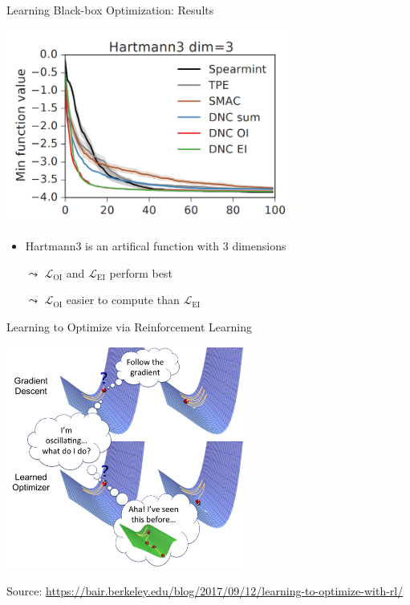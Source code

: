 \begin{frame}[c]{Learning Black-box Optimization: Results\newline {}}

\centering
\includegraphics[width=0.7\textwidth]{images/l2bo_hartmann3}

\begin{itemize}
  \item Hartmann3 is an artifical function with 3 dimensions
  \pause
  \item[$\leadsto$] $\mathcal{L}_{\text{OI}}$ and $\mathcal{L}_{\text{EI}}$ perform best
  \item[$\leadsto$] $\mathcal{L}_{\text{OI}}$ easier to compute than $\mathcal{L}_{\text{EI}}$ 
\end{itemize}

\end{frame}
\begin{frame}[c]{Learning to Optimize via Reinforcement Learning\newline {}}

\centering
\includegraphics[width=0.6\textwidth]{images/l2o_comic}

\tiny
Source: \url{https://bair.berkeley.edu/blog/2017/09/12/learning-to-optimize-with-rl/}

\end{frame}
